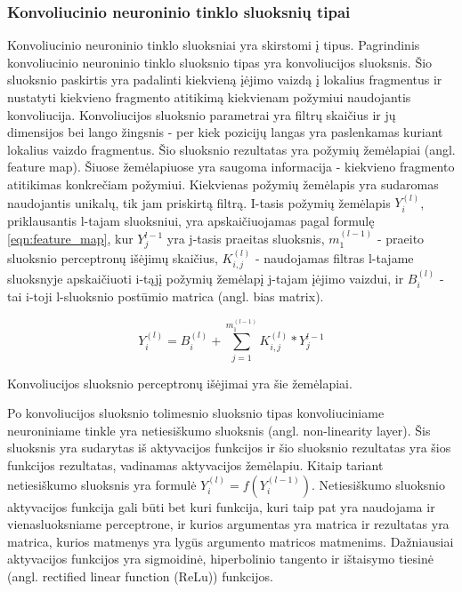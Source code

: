 \subsubsection{Konvoliucinio neuroninio tinklo sluoksnių tipai}

Konvoliucinio neuroninio tinklo sluoksniai yra skirstomi į tipus. Pagrindinis konvoliucinio neuroninio tinklo sluoksnio tipas yra konvoliucijos sluoksnis. Šio sluoksnio paskirtis yra padalinti kiekvieną įėjimo vaizdą į lokalius fragmentus ir nustatyti kiekvieno fragmento atitikimą kiekvienam požymiui naudojantis konvoliucija. Konvoliucijos sluoksnio parametrai yra filtrų skaičius ir jų dimensijos bei lango žingsnis - per kiek pozicijų langas yra paslenkamas kuriant lokalius vaizdo fragmentus. Šio sluoksnio rezultatas yra požymių žemėlapiai (angl. feature map). Šiuose žemėlapiuose yra saugoma informacija - kiekvieno fragmento atitikimas konkrečiam požymiui. Kiekvienas požymių žemėlapis yra sudaromas naudojantis unikalų, tik jam priskirtą filtrą. I-tasis požymių žemėlapis $Y_i^{(l)}$, priklausantis l-tajam sluoksniui, yra apskaičiuojamas pagal formulę \ref{eqn:feature_map}, kur $Y_j^{l-1}$ yra j-tasis praeitas sluoksnis, $m_1^{(l-1)}$ - praeito sluoksnio perceptronų išėjimų skaičius, $K_{i,j}^{(l)}$ - naudojamas filtras l-tajame sluoksnyje apskaičiuoti i-tąjį požymių žemėlapį j-tajam įėjimo vaizdui, ir $B_i^{(l)}$ - tai i-toji l-sluoksnio postūmio matrica (angl. bias matrix).

\begin{equation}
\label{eqn:feature_map}
	Y_i^{(l)} = B_i^{(l)} + \sum_{j = 1}^{m_1^{(l-1)}} K_{i,j}^{(l)} * Y_j^{l-1}
\end{equation}

Konvoliucijos sluoksnio perceptronų išėjimai yra šie žemėlapiai.

Po konvoliucijos sluoksnio tolimesnio sluoksnio tipas konvoliuciniame neuroniniame tinkle yra netiesiškumo sluoksnis (angl. non-linearity layer). Šis sluoksnis yra sudarytas iš aktyvacijos funkcijos ir šio sluoksnio rezultatas yra šios funkcijos rezultatas, vadinamas aktyvacijos žemėlapiu. Kitaip tariant netiesiškumo sluoksnis yra formulė $Y_i^{(l)} = f(Y_i^{(l - 1)})$. Netiesiškumo sluoksnio aktyvacijos funkcija gali būti bet kuri funkcija, kuri taip pat yra naudojama ir vienasluoksniame perceptrone, ir kurios argumentas yra matrica ir rezultatas yra matrica, kurios matmenys yra lygūs argumento matricos matmenims. Dažniausiai aktyvacijos funkcijos yra sigmoidinė, hiperbolinio tangento ir ištaisymo tiesinė (angl. rectified linear function (ReLu)) funkcijos.

